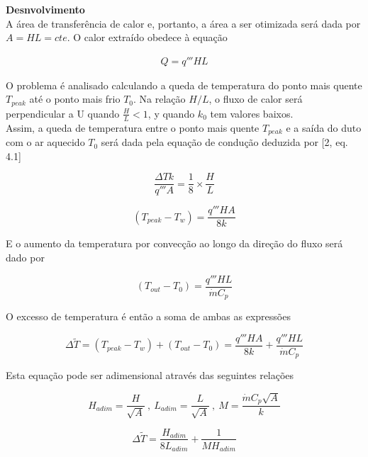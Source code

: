 \documentclass[12pt]{article}
\begin{document}
\textbf{Desnvolvimento}\\

A área de transferência de calor e, portanto, a área a ser otimizada será dada por $A = HL = cte$. O calor extraído obedece à equação

\begin{equation}
	\begin{aligned}
		Q = q''' HL
	\end{aligned}
\end{equation}

O problema é analisado calculando a queda de temperatura do ponto mais quente $T_{peak}$ até o ponto mais frio $T_{0}$. Na relação $H/L$, o fluxo de calor será perpendicular a U quando $\frac{H}{L} < 1$, y quando $k_{0}$ tem valores baixos.
\\
Assim, a queda de temperatura entre o ponto mais quente $T_{peak}$ e a saída do duto com o ar aquecido $T_{0}$ será dada pela equação de condução deduzida por [2, eq. 4.1]

\begin{equation}
	\frac{\Delta Tk}{q''' A} = \frac{1}{8} \times \frac{H}{L}
\end{equation}

\begin{equation}
	(T_{peak} - T_{w}) = \frac{q'''HA}{8k}
\end{equation}

E o aumento da temperatura por convecção ao longo da direção do fluxo será dado por

\begin{equation}
	(T_{out} - T_{0}) = \frac{q'''HL}{\dot{m} C_{p}}
\end{equation}

O excesso de temperatura é então a soma de ambas as expressões

\begin{equation}
		\Delta \widetilde{T} = (T_{peak} - T_{w}) + (T_{out} - T_{0}) = \frac{q'''HA}{8k} + \frac{q'''HL}{\dot{m} C_{p}}
\end{equation}

Esta equação pode ser adimensional através das seguintes relações

\begin{equation}
	H_{adim} = \frac{H}{\sqrt{A}} \ ,  \ L_{adim} = \frac{L}{\sqrt{A}} \ , \ M = \frac{\dot{m} C_{p} \sqrt{A}}{k}
\end{equation}

\begin{equation}
	\Delta \widetilde{T} = \frac{H_{adim}}{8L_{adim}} + \frac{1}{MH_{adim}}
\end{equation}
\end{document}
